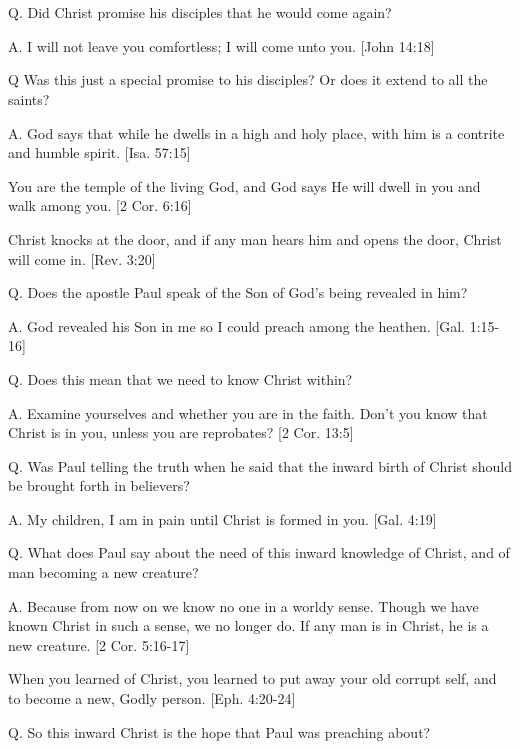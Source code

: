 \documentclass[../main.tex]{subfiles}
\begin{document}
	

	\section*{}
	Q. Did Christ promise his disciples that he would come again?

	A. I will not leave you comfortless; I will come unto you. [John 14:18]

	Q Was this just a special promise to his disciples? Or does it extend to all the saints?

	A. God says that while he dwells in a high and holy place, with him is a contrite and humble spirit. [Isa. 57:15]

	You are the temple of the living God, and God says He will dwell in you and walk among you. [2 Cor. 6:16]

	Christ knocks at the door, and if any man hears him and opens the door, Christ will come in. [Rev. 3:20]

	Q. Does the apostle Paul speak of the Son of God's being revealed in him?

	A. God revealed his Son in me so I could preach among the heathen. [Gal. 1:15-16]

	Q. Does this mean that we need to know Christ within?

	A. Examine yourselves and whether you are in the faith. Don't you know that Christ is in you, unless you are reprobates? [2 Cor. 13:5]

	Q. Was Paul telling the truth when he said that the inward birth of Christ should be brought forth in believers?

	A. My children, I am in pain until Christ is formed in you. [Gal. 4:19]

	Q. What does Paul say about the need of this inward knowledge of Christ, and of man becoming a new creature?

	A. Because from now on we know no one in a worldy sense. Though we have known Christ in such a sense, we no longer do. If any man is in Christ, he is a new creature. [2 Cor. 5:16-17]

	When you learned of Christ, you learned to put away your old corrupt self, and to become a new, Godly person. [Eph. 4:20-24]

	Q. So this inward Christ is the hope that Paul was preaching about?
\end{document}

